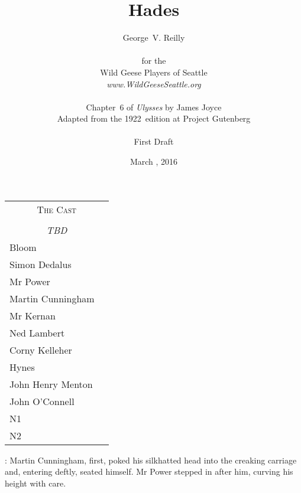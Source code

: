 


\title{\Huge Hades}
\author{George~V. Reilly\\
\\
{\small for the}\\
Wild Geese Players of Seattle\\
{\emph{www.WildGeeseSeattle.org}}\\
\\
{\small Chapter~6 of \emph{Ulysses} by James Joyce}\\
{\small Adapted from the 1922~edition at Project Gutenberg}
\\
\\
{\small First Draft}}
\date{March , 2016}
\raggedbottom



\maketitle
\thispagestyle{empty}
\pagebreak

\begin{tabular}{lp{10cm}}
    \multicolumn{2}{c}{\Large \textsc{The Cast}} \\
\\
    \multicolumn{2}{c}{\large \textit{TBD}} \\
Bloom \\
Simon Dedalus \\
Mr Power \\
Martin Cunningham \\
Mr Kernan \\
Ned Lambert \\
Corny Kelleher \\
Hynes \\
John Henry Menton \\
John O'Connell \\
N1 \\
N2 \\
\end{tabular}

\thispagestyle{empty}
\newpage


\setcounter{page}{1}


:
Martin Cunningham, first,
poked his silkhatted head into the creaking carriage
and, entering deftly, seated himself.
Mr Power stepped in after him,
curving his height with care.

